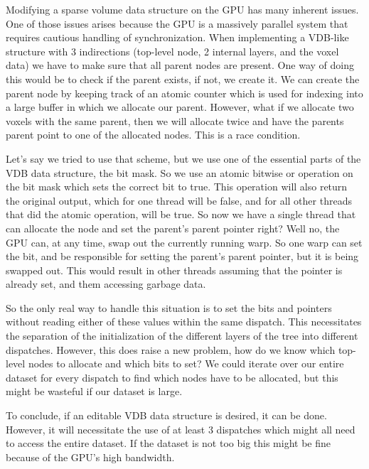 Modifying a sparse volume data structure on the GPU has many inherent issues. One of those issues arises because the GPU is a massively parallel system that requires cautious handling of synchronization. When implementing a VDB-like structure with 3 indirections (top-level node, 2 internal layers, and the voxel data) we have to make sure that all parent nodes are present. One way of doing this would be to check if the parent exists, if not, we create it. We can create the parent node by keeping track of an atomic counter which is used for indexing into a large buffer in which we allocate our parent. However, what if we allocate two voxels with the same parent, then we will allocate twice and have the parents parent point to one of the allocated nodes. This is a race condition.

Let's say we tried to use that scheme, but we use one of the essential parts of the VDB data structure, the bit mask. So we use an atomic bitwise or operation on the bit mask which sets the correct bit to true. This operation will also return the original output, which for one thread will be false, and for all other threads that did the atomic operation, will be true. So now we have a single thread that can allocate the node and set the parent's parent pointer right? Well no, the GPU can, at any time, swap out the currently running warp. So one warp can set the bit, and be responsible for setting the parent's parent pointer, but it is being swapped out. This would result in other threads assuming that the pointer is already set, and them accessing garbage data.

So the only real way to handle this situation is to set the bits and pointers without reading either of these values within the same dispatch. This necessitates the separation of the initialization of the different layers of the tree into different dispatches. However, this does raise a new problem, how do we know which top-level nodes to allocate and which bits to set? We could iterate over our entire dataset for every dispatch to find which nodes have to be allocated, but this might be wasteful if our dataset is large.

To conclude, if an editable VDB data structure is desired, it can be done. However, it will necessitate the use of at least 3 dispatches which might all need to access the entire dataset. If the dataset is not too big this might be fine because of the GPU's high bandwidth.

